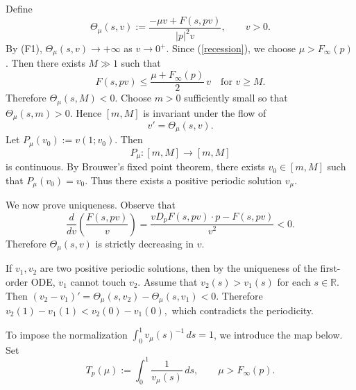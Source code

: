 \documentclass[preprint]{elsarticle}
\numberwithin{equation}{section}
\begin{document}
Define
\begin{equation*}
\Theta_\mu(s,v):=\frac{-\mu v+F(s,pv)}{|p|^2v},
\qquad v>0.
\end{equation*}
By (F1), $\Theta_\mu(s,v)\to+\infty$ as $
v\to0^+.$
Since (\ref{recession}),
we choose $\mu>F_\infty(p)$. Then there exists $M\gg1$ such that
\begin{equation*}
F(s,pv)\le \frac{\mu+F_\infty(p)}{2}\,v
\quad\text{for }v\ge M.
\end{equation*}
Therefore $\Theta_\mu(s,M)<0$. Choose $m>0$ sufficiently small so that $\Theta_\mu(s,m)>0$.
Hence $[m,M]$ is invariant under the flow of
$$
v'=\Theta_\mu(s,v).
$$
Let
$
P_\mu(v_0):=v(1;v_0).
$
Then
$$
P_\mu:[m,M]\to[m,M]
$$
is continuous. By Brouwer's fixed point theorem, there exists $v_0\in[m,M]$ such that
$
P_\mu(v_0)=v_0.
$
Thus there exists a positive periodic solution $v_\mu$.

We now prove uniqueness. Observe that
\begin{equation*}
\frac{d}{dv}\left(\frac{F(s,pv)}{v}\right)
=
\frac{vD_pF(s,pv)\cdot p-F(s,pv)}{v^2}<0.
\end{equation*}
Therefore
$
\Theta_\mu(s,v)
$
is strictly decreasing in $v$.

If $v_1,v_2$ are two positive periodic solutions, then by the uniqueness of the first-order ODE, $v_1$ cannot touch $v_2$. Assume that $v_2(s)>v_1(s)$ for each $s\in \mathbb R$.
Then
$
(v_2-v_1)'
=
\Theta_\mu(s,v_2)-\Theta_\mu(s,v_1)<0.
$
Therefore
$
v_2(1)-v_1(1)<v_2(0)-v_1(0),
$
which contradicts the periodicity.

To impose the normalization $\int_0^1 v_\mu(s)^{-1}\,ds=1$, we introduce the map below.
Set
\begin{equation*}
T_p(\mu):=\int_0^1\frac{1}{v_\mu(s)}\,ds,
\qquad
\mu>F_\infty(p).
\end{equation*}
\end{document}
